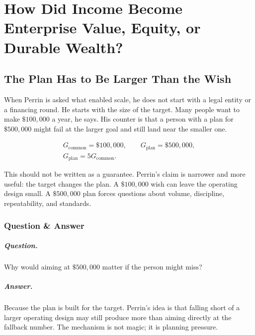 \documentclass[11pt,oneside]{book}
\begin{document}
\chapter{How Did Income Become Enterprise Value, Equity, or Durable Wealth?}

\section{The Plan Has to Be Larger Than the Wish}

When Perrin is asked what enabled scale, he does not start with a legal entity or a financing round. He starts with the size of the target. Many people want to make \(\$100{,}000\) a year, he says. His counter is that a person with a plan for \(\$500{,}000\) might fail at the larger goal and still land near the smaller one.

\begin{equation}
\begin{gathered}
G_{\mathrm{common}}=\$100{,}000,\qquad G_{\mathrm{plan}}=\$500{,}000,\\
G_{\mathrm{plan}}=5G_{\mathrm{common}}.
\end{gathered}
\end{equation}

This should not be written as a guarantee. Perrin's claim is narrower and more useful: the target changes the plan. A \(\$100{,}000\) wish can leave the operating design small. A \(\$500{,}000\) plan forces questions about volume, discipline, repeatability, and standards.

\subsection{Question \& Answer}

\paragraph{Question.}
Why would aiming at \(\$500{,}000\) matter if the person might miss?

\paragraph{Answer.}
Because the plan is built for the target. Perrin's idea is that falling short of a larger operating design may still produce more than aiming directly at the fallback number. The mechanism is not magic; it is planning pressure.
\end{document}
